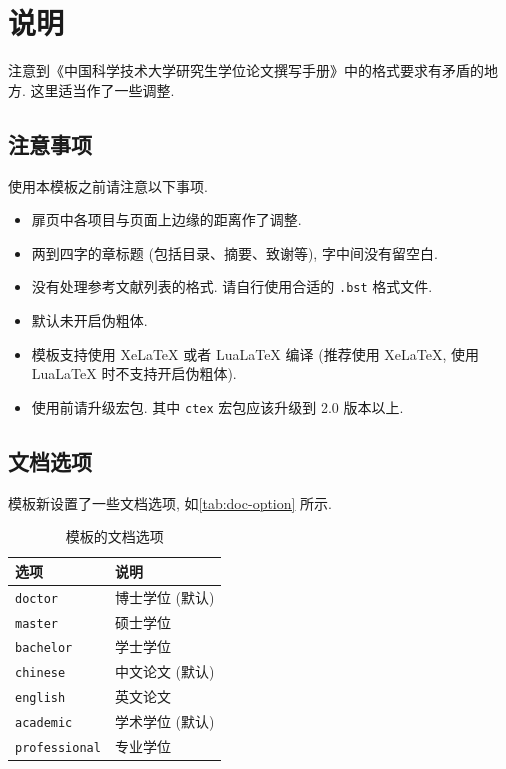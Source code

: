 ﻿\chapter{说明}
\label{chap:readme}

注意到《中国科学技术大学研究生学位论文撰写手册》中的格式要求有矛盾的地方.
这里适当作了一些调整.

\section{注意事项}

使用本模板之前请注意以下事项.

\begin{itemize}
  \item
    扉页中各项目与页面上边缘的距离作了调整.
  \item
    两到四字的章标题 (包括目录、摘要、致谢等), 字中间没有留空白.
  \item
    没有处理参考文献列表的格式. 请自行使用合适的 \verb|.bst| 格式文件.
  \item
    默认未开启伪粗体.
  \item
    模板支持使用 XeLaTeX 或者 LuaLaTeX 编译
    (推荐使用 XeLaTeX, 使用 LuaLaTeX 时不支持开启伪粗体).
  \item
    使用前请升级宏包. 其中 \verb|ctex| 宏包应该升级到 2.0 版本以上.
\end{itemize}

\section{文档选项}

模板新设置了一些文档选项, 如\autoref{tab:doc-option} 所示.

\begin{table}[!htb]
  \caption{模板的文档选项}
  \label{tab:doc-option}
  \centering
  \begin{tabular}{ll}
    \toprule
    选项                & 说明\\
    \midrule
    \verb|doctor|       & 博士学位 (默认)\\
    \verb|master|       & 硕士学位\\
    \verb|bachelor|     & 学士学位\\
    \midrule
    \verb|chinese|      & 中文论文 (默认)\\
    \verb|english|      & 英文论文\\
    \midrule
    \verb|academic|     & 学术学位 (默认)\\
    \verb|professional| & 专业学位\\
    \bottomrule
  \end{tabular}
\end{table}

